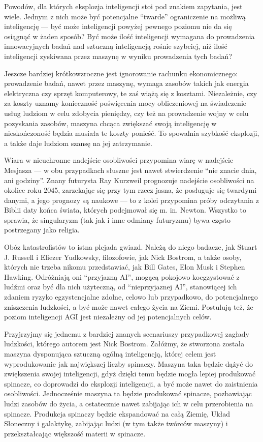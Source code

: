 \documentclass[10pt,a4paper]{article}
\begin{document}
	\par Powodów, dla których eksplozja inteligencji stoi pod znakiem zapytania, jest wiele. Jednym z nich może być potencjalne ``twarde'' ograniczenie na możliwą inteligencję — być może inteligencji powyżej pewnego poziomu nie da się osiągnąć w żaden sposób? Być może ilość inteligencji wymagana do prowadzenia innowacyjnych badań nad sztuczną inteligencją rośnie szybciej, niż ilość inteligencji zyskiwana przez maszynę w wyniku prowadzenia tych badań?
	\par Jeszcze bardziej krótkowzroczne jest ignorowanie rachunku ekonomicznego: prowadzenie badań, nawet przez maszynę, wymaga zasobów takich jak energia elektryczna czy sprzęt komputerowy, te zaś wiążą się z kosztami. Niezależnie, czy za koszty uznamy konieczność poświęcenia mocy obliczeniowej na świadczenie usług ludziom w celu zdobycia pieniędzy, czy też na prowadzenie wojny w celu pozyskania zasobów, maszyna chcąca zwiększać swoją inteligencję w nieskończoność będzia musiała te koszty ponieść. To spowalnia szybkość eksplozji, a także daje ludziom szansę na jej zatrzymanie.
	\par Wiara w nieuchronne nadejście osobliwości przypomina wiarę w nadejście Mesjasza — w obu przypadkach słuszne jest nawet stwierdzenie ``nie znacie dnia, ani godziny''. Znany futurysta Ray Kurzweil prognozuje nadejście osobliwości na okolice roku 2045, zarzekając się przy tym rzecz jasna, że posługuje się twardymi danymi, a jego prognozy są naukowe — to z kolei przypomina próby odczytania z Biblii daty końca świata, których podejmował się m. in. Newton. Wszystko to sprawia, że singularyzm (tak jak i inne odmiany futuryzmu) bywa często postrzegany jako religia.
	\par Obóz katastrofistów to istna plejada gwiazd. Należą do niego badacze, jak Stuart J. Russell i Eliezer Yudkowsky, filozofowie, jak Nick Bostrom, a także osoby, których nie trzeba nikomu przedstawiać, jak Bill Gates, Elon Musk i Stephen Hawking. Odróżniają oni ``przyjazną AI'', mogącą pokojowo koegzystować z ludźmi oraz być dla nich użyteczną, od ``nieprzyjaznej AI'', stanowiącej ich zdaniem ryzyko egzystencjalne zdolne, celowo lub przypadkowo, do potencjalnego zniszczenia ludzkości, a być może nawet całego życia na Ziemi. Postulują też, że poziom inteligencji AGI jest niezależny od jej potencjalnych celów.
	\par Przyjrzyjmy się jednemu z bardziej znanych scenariuszy przypadkowej zagłady ludzkości, którego autorem jest Nick Bostrom. Załóżmy, że stworzona została maszyna dysponująca sztuczną ogólną inteligencją, której celem jest wyprodukowanie jak największej liczby spinaczy. Maszyna taka będzie dążyć do zwiększenia swojej inteligencji, gdyż dzięki temu będzie mogła lepiej produkować spinacze, co doprowadzi do eksplozji inteligencji, a być może nawet do zaistnienia osobliwości. Jednocześnie maszyna ta będzie produkować spinacze, pozbawiając ludzi zasobów do życia, a ostatecznie nawet zabijając ich w celu przerobienia na spinacze. Produkcja spinaczy będzie ekspandować na całą Ziemię, Układ Słoneczny i galaktykę, zabijając ludzi (w tym także twórców maszyny) i przekształcając większość materii w spinacze.
\end{document}
